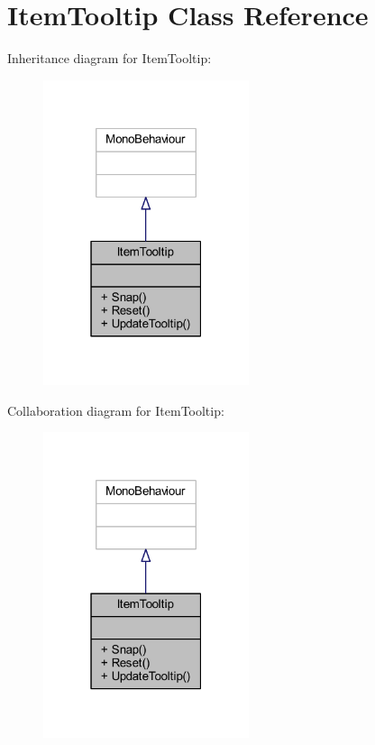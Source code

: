 \hypertarget{class_item_tooltip}{}\section{Item\+Tooltip Class Reference}
\label{class_item_tooltip}


Inheritance diagram for Item\+Tooltip\+:\nopagebreak
\begin{figure}[H]
\begin{center}
\leavevmode
\includegraphics[width=171pt]{class_item_tooltip__inherit__graph}
\end{center}
\end{figure}


Collaboration diagram for Item\+Tooltip\+:\nopagebreak
\begin{figure}[H]
\begin{center}
\leavevmode
\includegraphics[width=171pt]{class_item_tooltip__coll__graph}
\end{center}
\end{figure}
